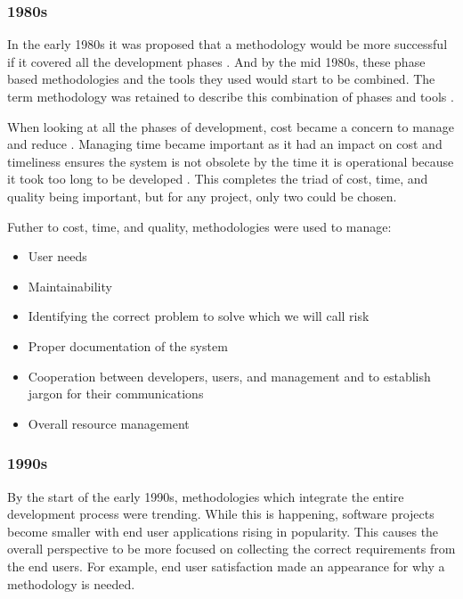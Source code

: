 \subsubsection{1980s}
In the early 1980s it was proposed that a methodology would be more successful if it covered all the development phases \cite{soi_1982}.
And by the mid 1980s, these phase based methodologies and the tools they used would start to be combined.
The term methodology was retained to describe this combination of phases and tools \cite{beregi_1985}. 

When looking at all the phases of development, cost became a concern to manage and reduce \cite{vanderlei_1983, peacham_1985, loesh_1985}.
Managing time became important as it had an impact on cost and timeliness ensures the system is not obsolete by the time it is operational because it took too long to be developed \cite{peacham_1985, beregi_1985, mannino_1987, paul_1993}.
This completes the triad of cost, time, and quality being important, but for any project, only two could be chosen.

Futher to cost, time, and quality, methodologies were used to manage:
\begin{itemize}
    \item User needs \cite{peacham_1985}
    \item Maintainability \cite{peacham_1985}
    \item Identifying the correct problem to solve which we will call risk \cite{peacham_1985}
    \item Proper documentation of the system \cite{loesh_1985}
    \item Cooperation between developers, users, and management and to establish jargon for their communications \cite{loesh_1985}
    \item Overall resource management \cite{mannino_1987}
\end{itemize}

\subsubsection{1990s}
By the start of the early 1990s, methodologies which integrate the entire development process were trending.
While this is happening, software projects become smaller with end user applications rising in popularity.
This causes the overall perspective to be more focused on collecting the correct requirements \cite{paul_1993} from the end users.
For example, end user satisfaction made an appearance for why a methodology is needed.
\cite{drake_1991}

